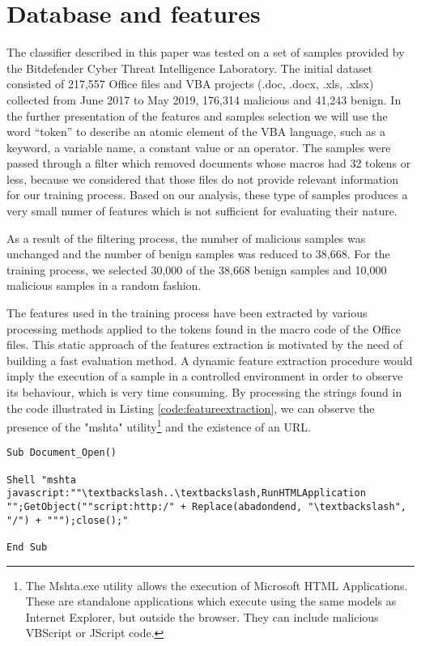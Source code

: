 \section{Database and features}
\par
The classifier described in this paper was tested on a set of samples provided by the Bitdefender Cyber Threat Intelligence Laboratory. The initial dataset consisted of 217,557 Office files and VBA projects (.doc, .docx, .xls, .xlsx) collected from June 2017 to May 2019, 176,314 malicious and 41,243 benign. In the further presentation of the features and samples selection we will use the word “token” to describe an atomic element of the VBA language, such as a keyword, a variable name, a constant value or an operator. The samples were passed through a filter which removed documents whose macros had 32 tokens or less,  because we considered that those files do not provide relevant information for our training process. Based on our analysis, these type of samples produces a very small numer of features which is not sufficient for evaluating their nature.  
\par
As a result of the filtering process, the number of malicious samples was unchanged and the number of benign samples was reduced to 38,668. For the training process, we selected 30,000 of the 38,668 benign samples and 10,000 malicious samples in a random fashion.
\par
The features used in the training process have been extracted by various processing methods applied to the tokens found in the macro code of the Office files. This static approach of the features extraction is motivated by the need of building a fast evaluation method. A dynamic feature extraction procedure would imply the execution of a sample in a controlled environment in order to observe its behaviour, which is very time consuming.  By processing the strings found in the code illustrated in Listing \ref{code:featureextraction}, we can observe the presence of the "mshta" utility\footnote{The Mshta.exe utility allows the execution of Microsoft HTML Applications. These are standalone applications which execute using the same models as Internet Explorer, but outside the browser. They can include malicious VBScript or JScript code.}   and the existence of an URL.

\begin{lstlisting}[style=A, caption={Example of malicious code inside a macro}, label={code:featureextraction}]
Sub Document_Open()

Shell "mshta javascript:""\textbackslash..\textbackslash,RunHTMLApplication "";GetObject(""script:http:/" + Replace(abadondend, "\textbackslash", "/") + """);close();"

End Sub
\end{lstlisting}

